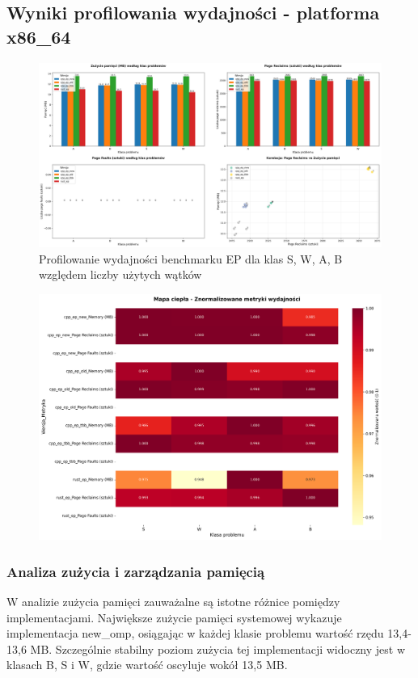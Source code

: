 \subsection{Wyniki profilowania wydajności - platforma x86\_64}
\begin{figure}[H]
    \centering
    \includegraphics[width=\textwidth]{analiza/images/parallel/ep/x86/chart_01_memory_comparison.png}
    \caption{Profilowanie wydajności benchmarku EP dla klas S, W, A, B względem liczby użytych wątków}
    \label{ep_porownanie_zuzycia_pamieci_x86_64}
\end{figure}
\begin{figure}[H]
    \centering
    \includegraphics[width=\textwidth]{analiza/images/parallel/ep/x86/chart_03_heatmap.png}
    \caption{}
    \label{}
\end{figure}
\subsubsection{Analiza zużycia i zarządzania pamięcią}
W analizie zużycia pamięci zauważalne są istotne różnice pomiędzy implementacjami. Największe zużycie pamięci systemowej wykazuje implementacja new\_omp, osiągając w każdej klasie problemu wartość rzędu 13,4-13,6 MB. Szczególnie stabilny poziom zużycia tej implementacji widoczny jest w klasach B, S i W, gdzie wartość oscyluje wokół 13,5 MB.

